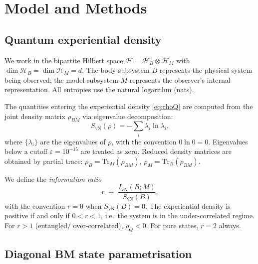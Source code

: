 \documentclass[12pt,a4paper]{article}
\newcommand{\SvN}{S_{\mathrm{vN}}}
\newcommand{\IvN}{I_{\mathrm{vN}}}
\newcommand{\rhoQ}{\rho_Q}
\newcommand{\calH}{\mathcal{H}}
\renewcommand{\Tr}{\mathrm{Tr}}
\begin{document}
\section{Model and Methods}\label{sec:methods}

\subsection{Quantum experiential density}

We work in the bipartite Hilbert space $\calH = \calH_B \otimes
\calH_M$ with $\dim \calH_B = \dim \calH_M = d$.  The body
subsystem $B$ represents the physical system being observed; the
model subsystem $M$ represents the observer's internal
representation.  All entropies use the natural logarithm (nats).

The quantities entering the experiential density
\eqref{eq:rhoQ} are computed from the joint density matrix
$\rho_{BM}$ via eigenvalue decomposition:
\begin{equation}\label{eq:SvN}
  \SvN(\rho) = -\sum_i \lambda_i \ln \lambda_i,
\end{equation}
where $\{\lambda_i\}$ are the eigenvalues of $\rho$, with the
convention $0 \ln 0 = 0$.  Eigenvalues below a cutoff
$\varepsilon = 10^{-15}$ are treated as zero.  Reduced density
matrices are obtained by partial trace:
$\rho_B = \Tr_M(\rho_{BM})$, $\rho_M = \Tr_B(\rho_{BM})$.

We define the \emph{information ratio}
\begin{equation}\label{eq:ratio}
  r \;\equiv\; \frac{\IvN(B;M)}{\SvN(B)},
\end{equation}
with the convention $r = 0$ when $\SvN(B) = 0$.  The experiential
density is positive if and only if $0 < r < 1$, i.e.\ the system
is in the under-correlated regime.  For $r > 1$ (entangled/
over-correlated), $\rhoQ < 0$.  For pure states, $r = 2$ always.

\subsection{Diagonal BM state parametrisation}\label{sec:diagonal}
\end{document}
